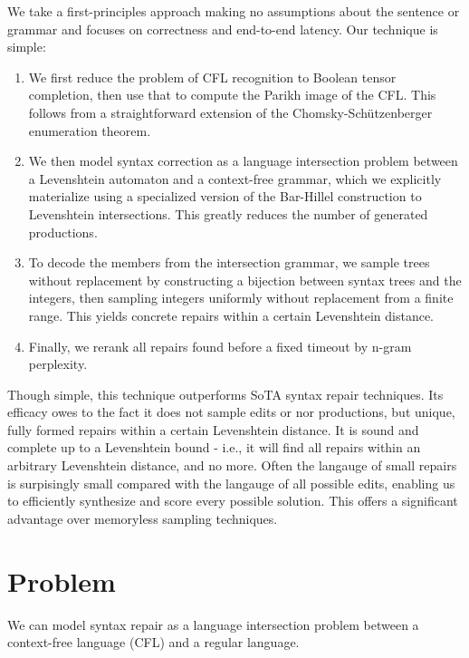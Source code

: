 \documentclass[sigplan,review,anonymous,acmsmall]{acmart}\settopmatter{printfolios=false,printccs=false,printacmref=false}
\begin{document}
  We take a first-principles approach making no assumptions about the sentence or grammar and focuses on correctness and end-to-end latency. Our technique is simple:

  \begin{enumerate}
    \item We first reduce the problem of CFL recognition to Boolean tensor completion, then use that to compute the Parikh image of the CFL. This follows from a straightforward extension of the Chomsky-Sch\"utzenberger enumeration theorem.
    \item We then model syntax correction as a language intersection problem between a Levenshtein automaton and a context-free grammar, which we explicitly materialize using a specialized version of the Bar-Hillel construction to Levenshtein intersections. This greatly reduces the number of generated productions.
    \item To decode the members from the intersection grammar, we sample trees without replacement by constructing a bijection between syntax trees and the integers, then sampling integers uniformly without replacement from a finite range. This yields concrete repairs within a certain Levenshtein distance.
    \item Finally, we rerank all repairs found before a fixed timeout by n-gram perplexity.
  \end{enumerate}

  Though simple, this technique outperforms SoTA syntax repair techniques. Its efficacy owes to the fact it does not sample edits or nor productions, but unique, fully formed repairs within a certain Levenshtein distance. It is sound and complete up to a Levenshtein bound - i.e., it will find all repairs within an arbitrary Levenshtein distance, and no more. Often the langauge of small repairs is surpisingly small compared with the langauge of all possible edits, enabling us to efficiently synthesize and score every possible solution. This offers a significant advantage over memoryless sampling techniques.

  \pagebreak

  

  \section{Problem}

  We can model syntax repair as a language intersection problem between a context-free language (CFL) and a regular language.
\end{document}
